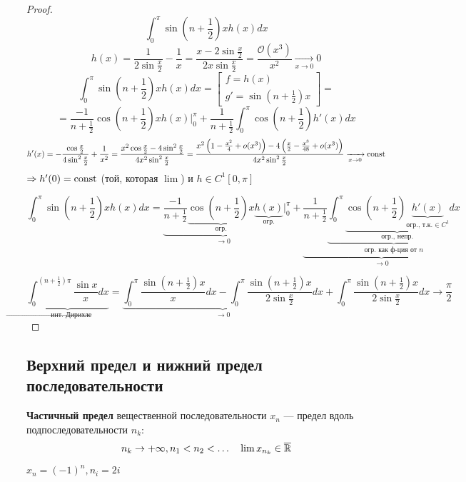 \begin{proof}
    $$\int_0^\pi \sin\left(n+\frac{1}{2}\right)x h(x)dx$$
    $$h(x)=\frac{1}{2\sin\frac{x}{2}}-\frac{1}{x}=\frac{x-2\sin\frac{x}{2}}{2x\sin\frac{x}{2}}=\frac{\mathcal O(x^3)}{x^2}\xrightarrow[x\to0]{}0$$
    $$\int_0^\pi \sin\left(n+\frac{1}{2}\right)x h(x)dx = \left[\begin{array}{ll}
        f = h(x) \\
        g' = \sin\left(n+\frac{1}{2}\right)x
    \end{array}\right]=$$
    $$=\frac{-1}{n+\frac{1}{2}}\cos\left(n+\frac{1}{2}\right)x h(x)\Big|_0^\pi + \frac{1}{n+\frac{1}{2}}\int_0^\pi \cos\left(n+\frac{1}{2}\right) h'(x)dx$$
    $$h'(x) = -\frac{\cos\frac{x}{2}}{4\sin^2\frac{x}{2}}+\frac{1}{x^2}=\frac{x^2\cos\frac{x}{2} - 4\sin^2 \frac{x}{2}}{4x^2\sin^2\frac{x}{2}} = \frac{x^2\left(1-\frac{x^2}{4}+o(x^3)\right) - 4\left(\frac{x}{2}-\frac{x^3}{48}+o(x^3)\right)}{4x^2\sin^2\frac{x}{2}}\xrightarrow[x\to0]{} \text{const}$$
    $\Rightarrow h'(0)=\text{const}$ (той, которая $\lim$) и $h\in C^1[0,\pi]$

    $$\int_0^\pi \sin\left(n+\frac{1}{2}\right)x h(x)dx=\underbrace{\frac{-1}{n+\frac{1}{2}}\underbrace{\cos\left(n+\frac{1}{2}\right)x}_{\text{огр.}} \underbrace{h(x)}_{\text{огр.}}}_{\to0}\Big|_0^\pi + \underbrace{\frac{1}{n+\frac{1}{2}}\underbrace{\int_0^\pi \underbrace{\cos\left(n+\frac{1}{2}\right) \underbrace{h'(x)}_{\text{огр., т.к.}\in C^1}}_{\text{огр., непр.}}dx}_{\text{огр. как ф-ция от } n}}_{\to0}$$

    $$\underbrace{\int_0^{\left(n+\frac{1}{2}\right)\pi} \frac{\sin x}{x}dx}_{\to\text{инт. Дирихле}} = \underbrace{\int_0^\pi \frac{\sin\left(n+\frac{1}{2}\right)x}{x}dx - \int_0^\pi \frac{\sin\left(n+\frac{1}{2}\right)x}{2\sin\frac{x}{2}}dx}_{\to0} + \int_0^\pi \frac{\sin\left(n+\frac{1}{2}\right)x}{2\sin\frac{x}{2}}dx\to\frac{\pi}{2}$$
\end{proof}

\subsection*{Верхний предел и нижний предел последовательности}

\begin{definition}
    \textbf{Частичный предел} вещественной последовательности $x_n$ --- предел вдоль подпоследовательности $n_k$:
    $$n_k\to+\infty, n_1<n_2<\ldots \quad \lim x_{n_k}\in\overline{\mathbb{R}}$$
\end{definition}

\begin{example}
    $x_n=(-1)^n, n_i=2i$
\end{example}

